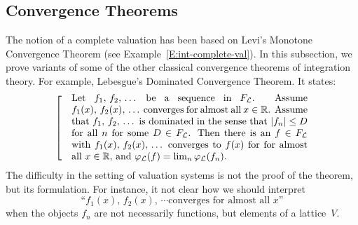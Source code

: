\documentclass[main.tex]{subfiles}
\begin{document}

\subsection{Convergence Theorems}
\label{SS:complete-val_convergence}
%
%
The notion of a complete valuation
has been based on Levi's Monotone Convergence Theorem
(see Example~\ref{E:int-complete-val}).
In this subsection,
we prove variants of some of the other classical convergence theorems
of integration theory.
For example, 
Lebesgue's Dominated Convergence Theorem.
It states:
\begin{equation}
\label{eq:Lebesgue}
\left[\quad
\begin{minipage}{.7\columnwidth}
Let $f_1,\,f_2,\,\dotsc$ be a sequence in~$\LF$.

Assume $f_1(x),\,f_2(x),\,\dotsc$
converges for almost all~$x\in\R$.

Assume that $f_1,\,f_2,\,\dotsc$
 is dominated in the sense that
 $|f_n|\leq D$ for all~$n$
for some $D\in\LF$.

Then there is an $f\in\LF$
with $f_1(x),\,f_2(x),\,\dotsc$ converges to $f(x)$ for 
for almost all~$x\in\R$,
and $\Lphi(f) = \lim_n\Lphi(f_n)$.
\end{minipage}
\right.
\end{equation} 
The difficulty 
in the setting of  valuation systems
is not the proof of the theorem,
but its formulation.
For instance, it 
not clear how we should interpret 
\begin{equation*}
\text{``$f_1(x),\,f_2(x),\,\dotsb$
converges for almost all~$x$''}
\end{equation*}
when the objects $f_n$ are not necessarily functions,
but elements of a lattice~$V$.
\end{document}
